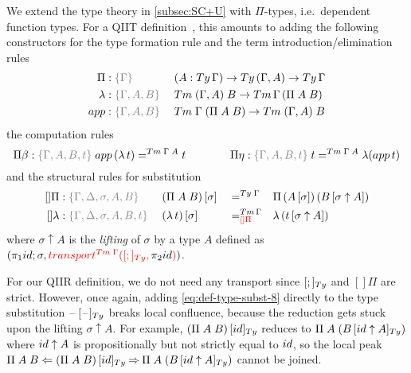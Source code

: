 \documentclass[a4paper,UKenglish,numberwithinsect,cleveref,thm-restate]{lipics-v2021}
\begin{document}
We extend the type theory in \cref{subsec:SC+U} with $\Pi$-types, i.e.\ dependent function types. %
For a QIIT definition~\cite{Altenkirch2016a}, this amounts to adding the following constructors for the type formation rule and the term introduction/elimination rules
\begin{alignat*}{3}
  \Pi     &: \implicit{\Gamma}           \; && (A : \Ty\,\Gamma) \to \Ty\,(\Gamma, A) \to \Ty\,\Gamma \\
  \lambda &: \implicit{\Gamma, A, B}     \; && \Tm\;(\Gamma, A)\;B \to \Tm\,\Gamma\,(\Pi\;A\;B) \\
  \mathsf{app} &: \implicit{\Gamma, A, B}\; && \Tm\;\Gamma\;(\Pi\;A\;B) \to \Tm\;(\Gamma, A)\;B
\end{alignat*}
the computation rules
\[
  \Pi\beta           : \implicit{\Gamma, A, B, t}\; \mathsf{app}\,(\lambda\,t) =^{\Tm\;\Gamma\;A} t
  \qquad\qquad
  \Pi\eta            : \implicit{\Gamma, A, B, t}\; t                         =^{\Tm\;\Gamma\;A} \lambda(\mathsf{app}\,t)
\]
and the structural rules for substitution
\begin{alignat}{5}
  []\Pi              & : \implicit{\Gamma, \Delta, \sigma, A, B}\;    && \sub{(\Pi\;A\;B)}{\sigma} && =^{\Ty\;\Gamma} && \Pi\,(\sub{A}{\sigma})\,(\sub{B}{\sigma\uparrow A}) \label{eq:def-type-subst-8} \\
  \mathsf{[]\lambda} & : \implicit{\Gamma, \Delta, \sigma, A, B, t}\; && \sub{(\lambda\,t)}{\sigma} && =^{\Tm\,\Gamma}_{\alert{[]\Pi}} && \lambda\,(\sub{t}{\sigma \uparrow A}) \nonumber
\end{alignat}
where $\sigma \uparrow A$ is the \emph{lifting}  of $\sigma$ by a type $A$ defined as $(\pi_1\idS; \sigma, \alert{\transfib{\Tm\;\Gamma}{[;]_{\Ty}}{\color{black}\pi_2\idS}})$. 

For our QIIR definition, %
we do not need any transport since $[;]_{\Ty}$ and $[]\Pi$ are strict.
However, once again, adding \eqref{eq:def-type-subst-8} directly to the type substitution $\subTy{\blank}{\blank}$ breaks local confluence, because the reduction gets stuck upon the lifting $\sigma \uparrow A$.
For example, $\subTy{(\Pi\;A\;B)}{\idS}$ reduces to $\Pi\;A\;(\subTy{B}{\idS \uparrow A})$ where $\idS \uparrow A$ is propositionally but not strictly equal to $\idS$, so the local peak $\Pi\;A\;B \Leftarrow \subTy{(\Pi\;A\;B)}{\idS} \reduce \Pi\;A\;(\subTy{B}{\idS \uparrow A})$ cannot be joined. 
\end{document}
